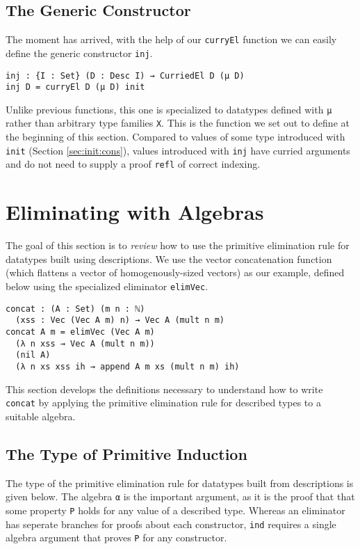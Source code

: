 \documentclass[preprint,nonatbib]{sigplanconf}
\newcommand{\refsec}[1]{Section \ref{sec:#1}}
\begin{document}
\subsection{The Generic Constructor}

The moment has arrived, with the help of our {\tt curryEl} function we
can easily define the generic constructor {\tt inj}.

\begin{verbatim}
inj : {I : Set} (D : Desc I) → CurriedEl D (μ D)
inj D = curryEl D (μ D) init
\end{verbatim}

Unlike previous functions, this one is specialized to datatypes
defined with {\tt μ} rather than arbitrary type families {\tt X}. This
is the function we set out to define at the beginning of this section.
Compared to values of some type introduced with {\tt init} (\refsec{init:cons}),
values introduced with {\tt inj} have curried arguments and do not
need to supply a proof {\tt refl} of correct indexing.

\section{Eliminating with Algebras}
\label{sec:ind}

The goal of this section is to {\it review} how to use the primitive
elimination rule for datatypes built using descriptions. We use
the vector concatenation function (which flattens a vector of
homogenously-sized vectors) as our example, defined below using the
specialized eliminator {\tt elimVec}.

\begin{verbatim}
concat : (A : Set) (m n : ℕ)
  (xss : Vec (Vec A m) n) → Vec A (mult n m)
concat A m = elimVec (Vec A m)
  (λ n xss → Vec A (mult n m))
  (nil A)
  (λ n xs xss ih → append A m xs (mult n m) ih)
\end{verbatim}

This section develops the definitions necessary to understand how to
write {\tt concat} by applying the primitive elimination rule for
described types to a suitable algebra.

\subsection{The Type of Primitive Induction}

The type of the primitive elimination rule for datatypes built from
descriptions is given below.
The algebra {\tt α} is the important argument, as it is the proof that
that some property {\tt P} holds for any value of a
described type.
Whereas an eliminator
has seperate branches for proofs about each constructor, {\tt ind}
requires a single algebra argument that proves {\tt P} for any
constructor.
\end{document}
